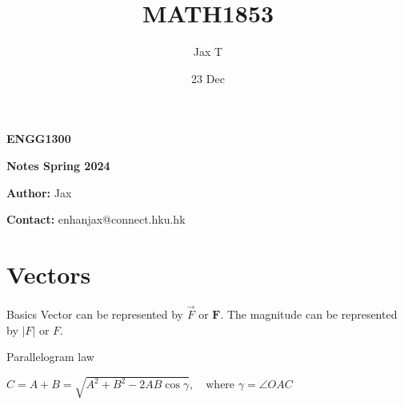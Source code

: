 \documentclass{article}
\title{MATH1853}
\author{Jax T}
\date{23 Dec}
\begin{document}
\begin{titlepage}
    \null\vfill %
    
    \centering
    \Huge\textbf{ENGG1300}
    
    \vspace{0.1cm}
    \Large\textbf{Notes Spring 2024}
    
    \vspace{1cm}
    \normalsize\textbf{Author:} Jax
    
    \normalsize\textbf{Contact:} enhanjax@connect.hku.hk
    \vfill %
\end{titlepage}


\section{Vectors}

\begin{definition}[]{Basics}
  Vector can be represented by $\vec{F}$ or $\boldsymbol{F}$. The magnitude can be represented by $|F|$ or $F$.
\end{definition}

\begin{definition}[]{Parallelogram law}


  $C=A+B=\sqrt{A^2+B^2-2AB\cos{\gamma}},\quad\text{where }\gamma=\angle OAC$
  
\end{definition}
\end{document}
